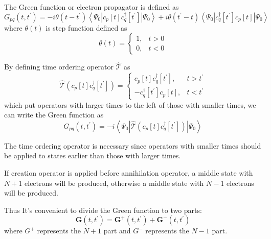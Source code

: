 The Green function or electron propagator is defined as
\begin{equation} \label{eq:greendef}
G_{p q}\left(t, t^{\prime}\right)=-i \theta\left(t-t^{\prime}\right)\left\langle\Psi_{0}\left|c_{p}[t] c_{q}^{\dagger}\left[t^{\prime}\right]\right| \Psi_{0}\right\rangle+ i \theta\left(t^{\prime}-t\right)\left\langle\Psi_{0}\left|c_{q}^{\dagger}\left[t^{\prime}\right] c_{p}[t]\right| \Psi_{0}\right\rangle
\end{equation}
where $\theta(t)$ is step function defined as
\begin{equation}
\theta(t)=\left\{\begin{array}{ll}{1,} & {t>0} \\ {0,} & {t<0}\end{array}\right.
\end{equation}

By defining time ordering operator $\hat{\mathcal{T}}$ as
\begin{equation}
\hat{\mathcal{T}}\left(c_{p}[t] c_{q}^{\dagger}\left[t^{\prime}\right]\right)=\left\{\begin{array}{cc}{c_{p}[t] c_{q}^{\dagger}\left[t^{\prime}\right],} & {t>t^{\prime}} \\ {-c_{q}^{\dagger}\left[t^{\prime}\right] c_{p}[t],} & {t<t^{\prime}}\end{array}\right.
\end{equation}
which put operators with larger times to the left of those with smaller times,
we can write the Green function as
\begin{equation}
G_{p q}\left(t, t^{\prime}\right)=-i\left\langle\Psi_{0}\left|\hat{\mathcal{T}}\left(c_{p}[t] c_{q}^{\dagger}\left[t^{\prime}\right]\right)\right| \Psi_{0}\right\rangle
\end{equation}

The time ordering operator is necessary since operators with smaller times should be applied to states earlier than those with larger times.

If creation operator is applied before annihilation operator, a middle state with $N+1$ electrons will be produced, otherwise a middle state with $N-1$ electrons will be produced.

Thus It's convenient to divide the Green function to two parts:
\begin{equation}
\boldsymbol{G}\left(t, t^{\prime}\right)=\boldsymbol{G}^{+}\left(t, t^{\prime}\right)+\boldsymbol{G}^{-}\left(t, t^{\prime}\right)
\end{equation}
where $G^{+}$ represents the $N+1$ part and $G^{-}$ represents the $N-1$ part.

